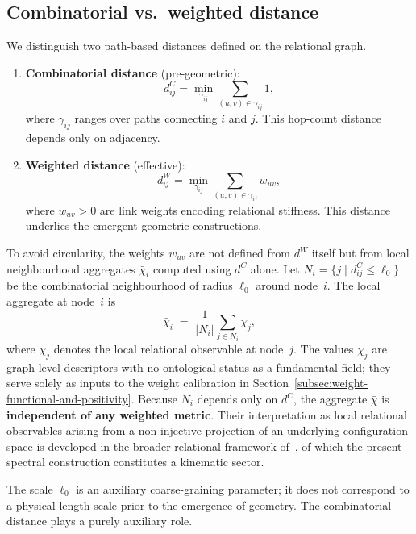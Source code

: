 \subsection{Combinatorial vs.\ weighted distance}
  \label{subsec:combinatorial-vs.-weighted-distance}

  We distinguish two path-based distances defined on the relational graph.

  \begin{enumerate}
    \item \textbf{Combinatorial distance} (pre-geometric):
    \[
      d_{ij}^{C} = \min_{\gamma_{ij}} \sum_{(u,v)\in\gamma_{ij}} 1,
    \]
    where $\gamma_{ij}$ ranges over paths connecting $i$ and $j$.
    This hop-count distance depends only on adjacency.

    \item \textbf{Weighted distance} (effective):
    \[
      d_{ij}^{W} = \min_{\gamma_{ij}} \sum_{(u,v)\in\gamma_{ij}} w_{uv},
    \]
    where $w_{uv} > 0$ are link weights encoding relational stiffness.
    This distance underlies the emergent geometric constructions.
  \end{enumerate}

  To avoid circularity, the weights $w_{uv}$ are not defined from $d^W$ itself
  but from local neighbourhood aggregates $\bar{\chi}_i$ computed using $d^C$ alone.
  Let $N_i = \{ j \mid d_{ij}^C \le \ell_0 \}$ be the combinatorial neighbourhood
  of radius $\ell_0$ around node~$i$.
  The local aggregate at node~$i$ is
  \begin{equation}
    \bar{\chi}_i \;=\; \frac{1}{|N_i|} \sum_{j \in N_i} \chi_j,
    \label{eq:chi-bar}
  \end{equation}
  where $\chi_j$ denotes the local relational observable at node~$j$.
  The values $\chi_j$ are graph-level descriptors with no ontological status
  as a fundamental field; they serve solely as inputs to the weight calibration
  in Section~\ref{subsec:weight-functional-and-positivity}.
  Because $N_i$ depends only on $d^C$, the aggregate $\bar{\chi}$ is
  \textbf{independent of any weighted metric}.
  Their interpretation as local relational observables arising from a
  non-injective projection of an underlying configuration space is
  developed in the broader relational framework of~\cite{Foundation},
  of which the present spectral construction constitutes a kinematic sector.

  The scale $\ell_0$ is an auxiliary coarse-graining parameter; it does not
  correspond to a physical length scale prior to the emergence of geometry.
  The combinatorial distance plays a purely auxiliary role.
